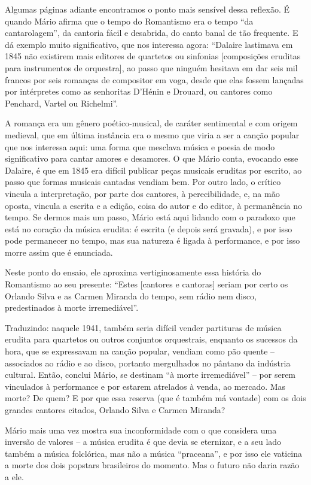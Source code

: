 Algumas páginas adiante encontramos o ponto mais sensível dessa
reflexão. É quando Mário afirma que o tempo do Romantismo era o tempo
``da cantarolagem'', da cantoria fácil e desabrida, do canto banal de
tão frequente. E dá exemplo muito significativo, que nos interessa
agora: ``Dalaire lastimava em 1845 não existirem mais editores de
quartetos ou sinfonias {[}composições eruditas para instrumentos de
orquestra{]}, ao passo que ninguém hesitava em dar seis mil francos por
seis romanças de compositor em voga, desde que elas fossem lançadas por
intérpretes como as senhoritas D'Hénin e Drouard, ou cantores como
Penchard, Vartel ou Richelmi''.

A romança era um gênero poético-musical, de caráter sentimental e com
origem medieval, que em última instância era o mesmo que viria a ser a
canção popular que nos interessa aqui: uma forma que mesclava música e
poesia de modo significativo para cantar amores e desamores. O que Mário
conta, evocando esse Dalaire, é que em 1845 era difícil publicar peças
musicais eruditas por escrito, ao passo que formas musicais cantadas
vendiam bem. Por outro lado, o crítico vincula a interpretação, por
parte dos cantores, à perecibilidade, e, na mão oposta, vincula a
escrita e a edição, coisa do autor e do editor, à permanência no tempo.
Se dermos mais um passo, Mário está aqui lidando com o paradoxo que está
no coração da música erudita: é escrita (e depois será gravada), e por
isso pode permanecer no tempo, mas sua natureza é ligada à performance,
e por isso morre assim que é enunciada.

Neste ponto do ensaio, ele aproxima vertiginosamente essa história do
Romantismo ao seu presente: ``Estes {[}cantores e cantoras{]} seriam por
certo os Orlando Silva e as Carmen Miranda do tempo, sem rádio nem
disco, predestinados à morte irremediável''.

Traduzindo: naquele 1941, também seria difícil vender partituras de
música erudita para quartetos ou outros conjuntos orquestrais, enquanto
os sucessos da hora, que se expressavam na canção popular, vendiam como
pão quente -- associados ao rádio e ao disco, portanto mergulhados no
pântano da indústria cultural. Então, conclui Mário, se destinam ``à
morte irremediável'' -- por serem vinculados à performance e por estarem
atrelados à venda, ao mercado. Mas morte? De quem? E por que essa
reserva (que é também má vontade) com os dois grandes cantores citados,
Orlando Silva e Carmen Miranda?

Mário mais uma vez mostra sua inconformidade com o que considera uma
inversão de valores -- a música erudita é que devia se eternizar, e a
seu lado também a música folclórica, mas não a música ``praceana'', e
por isso ele vaticina a morte dos dois popstars brasileiros do momento.
Mas o futuro não daria razão a ele.

